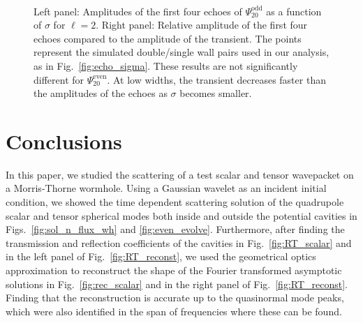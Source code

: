 \documentclass[article,aps,nofootinbib,twocolumn,superscriptaddress]{revtex4-1}
\begin{document}
\begin{figure}
\centering
{} \,
\caption{\label{fig:echo_sigma_odd} Left panel: Amplitudes of the first four echoes of $\Psi^{\mathrm{odd}}_{20}$ as a function of $\sigma$ for $\ell=2$. Right panel: Relative amplitude of the first four echoes compared to the amplitude of the transient. The points represent the simulated double/single wall pairs used in our analysis, as in Fig.~\ref{fig:echo_sigma}. These results are not significantly different for $\Psi^{\mathrm{even}}_{20}$. At low widths, the transient decreases faster than the amplitudes of the echoes as $\sigma$ becomes smaller.} 
\end{figure}
\section{Conclusions}\label{sec:conclusions}
In this paper, we studied the scattering of a test scalar and tensor wavepacket on a Morris-Thorne wormhole. Using a Gaussian wavelet as an incident initial condition, we showed the time dependent scattering solution of the quadrupole scalar and tensor spherical modes both inside and outside the potential cavities in Figs.~\ref{fig:sol_n_flux_wh} and \ref{fig:even_evolve}. Furthermore, after finding the transmission and reflection coefficients of the cavities in Fig.~\ref{fig:RT_scalar} and in the left panel of Fig.~\ref{fig:RT_reconst}, we used the geometrical optics approximation to reconstruct the shape of the Fourier transformed asymptotic solutions in Fig.~\ref{fig:rec_scalar} and in the right panel of Fig.~\ref{fig:RT_reconst}. Finding that the reconstruction is accurate up to the quasinormal mode peaks, which were also identified in the span of frequencies where these can be found. 
\end{document}
